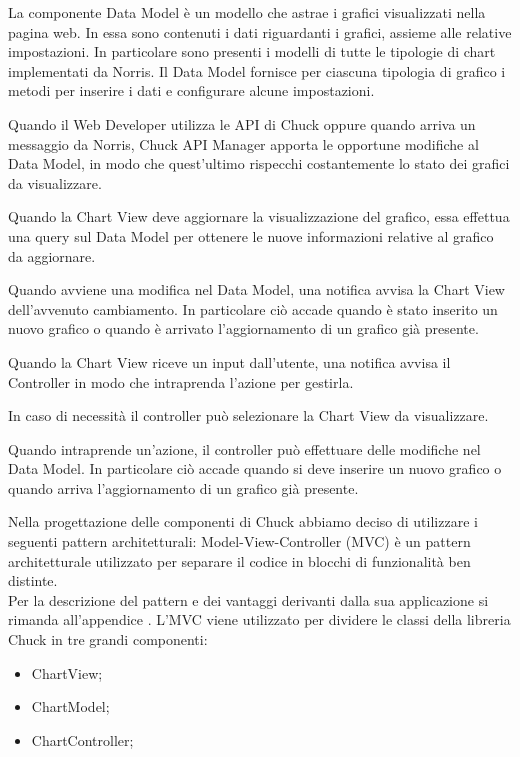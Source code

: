 		La componente Data Model è un modello che astrae i grafici visualizzati nella pagina web. In essa sono contenuti i dati riguardanti i grafici, assieme alle relative impostazioni. In particolare sono presenti i modelli di tutte le tipologie di chart implementati da Norris. Il Data Model fornisce per ciascuna tipologia di grafico i metodi per inserire i dati e configurare alcune impostazioni. 
    
	
		Quando il Web Developer utilizza le API di Chuck oppure quando arriva un messaggio da Norris, Chuck API Manager apporta le opportune modifiche al Data Model, in modo che quest'ultimo rispecchi costantemente lo stato dei grafici da visualizzare.

		Quando la Chart View deve aggiornare la visualizzazione del grafico, essa effettua una query sul Data Model per ottenere le nuove informazioni relative al grafico da aggiornare.

		Quando avviene una modifica nel Data Model, una notifica avvisa la Chart View dell'avvenuto cambiamento. In particolare ciò accade quando è stato inserito un nuovo grafico o quando è arrivato l'aggiornamento di un grafico già presente.

		Quando la Chart View riceve un input dall'utente, una notifica avvisa il Controller in modo che intraprenda l'azione per gestirla.

		In caso di necessità il controller può selezionare la Chart View da visualizzare.
		
		Quando intraprende un'azione, il controller può effettuare delle modifiche nel Data Model. In particolare ciò accade quando si deve inserire un nuovo grafico o quando arriva l'aggiornamento di un grafico già presente.

	Nella progettazione delle componenti di Chuck abbiamo deciso di utilizzare i seguenti pattern architetturali:
		Model-View-Controller (MVC) è un pattern architetturale utilizzato per separare il codice in blocchi di funzionalità ben distinte.\\
		Per la descrizione del pattern e dei vantaggi derivanti dalla sua applicazione si rimanda all'appendice .
			L'MVC viene utilizzato per dividere le classi della libreria Chuck in tre grandi componenti:
			\begin{itemize}
				\item ChartView;
				\item ChartModel;
				\item ChartController;
			\end{itemize}
